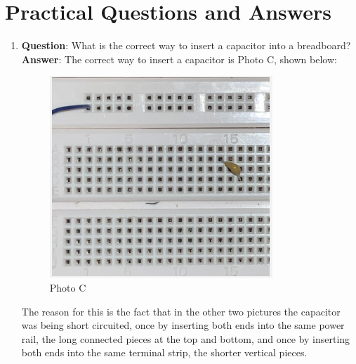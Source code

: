 \documentclass[12pt]{article}
\numberwithin{equation}{section}
\numberwithin{figure}{section}
\begin{document}
    \section{Practical Questions and Answers}
    \begin{enumerate}\addtocounter{enumi}{3}
        \item \textbf{Question}: What is the correct way to insert a capacitor into a breadboard?
        \newline
        \textbf{Answer}: The correct way to insert a capacitor is Photo C, shown below: 
        \begin{figure}[H]
            \begin{center}
               \includegraphics[scale=.5]{PhotoC.png}
               \caption{Photo C}
               \label{fig:Question4Answer}
            \end{center}
        \end{figure}
        
        The reason for this is the fact that in the other two pictures the capacitor was being short 
        circuited, once by inserting both ends into the same power rail, the long connected pieces at 
        the top and bottom, and once by inserting both ends into the same terminal strip, the shorter 
        vertical pieces.


\end{enumerate}
\end{document}

